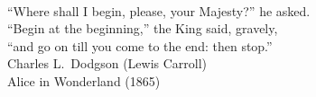 \documentclass[12pt,a4paper,twoside]{book}
\renewcommand{\thefigure}{{\normalfont\arabic{chapter}\alph{figure}}}
\renewcommand{\thetable}{{\normalfont\arabic{chapter}.\arabic{table}}}
\begin{document}
\frontmatter
\null\clearpage


\cleardoublepage
{\markboth{}{}
  \pagestyle{empty}
  ~\vspace*{20mm}
  \begin{flushright}
    \fontsize{12}{16}\selectfont
    ``Where shall I begin, please, your Majesty?'' he asked. \\
    ``Begin at the beginning,'' the King said, gravely, \\
    ``and go on till you come to the end: then stop.'' \\[2ex]
    \fontsize{10}{12}\selectfont
    Charles L.\ Dodgson (Lewis Carroll) \\
    Alice in Wonderland (1865) \par
  \end{flushright}}
\cleardoublepage
\mainmatter













\appendix
\renewcommand{\thefigure}{{\normalfont\Alph{chapter}\arabic{figure}}}
\renewcommand{\thetable}{{\normalfont\Alph{chapter}.\arabic{table}}}






%
%
\cleardoublepage
\end{document}
